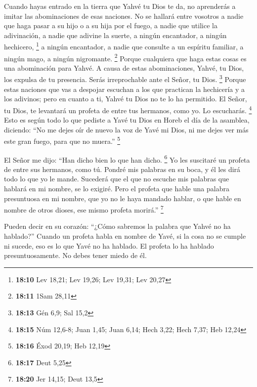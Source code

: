 \begin{paracol}{2}
 Cuando hayas entrado en la tierra que Yahvé tu Dios te
da, no aprenderás a imitar las abominaciones de esas naciones.
 No se hallará entre vosotros a nadie que haga pasar a su
hijo o a su hija por el fuego, a nadie que utilice la adivinación, a
nadie que adivine la suerte, a ningún encantador, a ningún hechicero,
\footnote{\textbf{18:10} Lev 18,21; Lev 19,26; Lev 19,31; Lev 20,27}
 a ningún encantador, a nadie que consulte a un espíritu
familiar, a ningún mago, a ningún nigromante. \footnote{\textbf{18:11}
  1Sam 28,11}  Porque cualquiera que haga estas cosas es
una abominación para Yahvé. A causa de estas abominaciones, Yahvé, tu
Dios, los expulsa de tu presencia.  Serás irreprochable
ante el Señor, tu Dios. \footnote{\textbf{18:13} Gén 6,9; Sal 15,2}
 Porque estas naciones que vas a despojar escuchan a los
que practican la hechicería y a los adivinos; pero en cuanto a ti, Yahvé
tu Dios no te lo ha permitido.  El Señor, tu Dios, te
levantará un profeta de entre tus hermanos, como yo. Lo escucharás.
\footnote{\textbf{18:15} Núm 12,6-8; Juan 1,45; Juan 6,14; Hech 3,22;
  Hech 7,37; Heb 12,24}  Esto es según todo lo que
pediste a Yavé tu Dios en Horeb el día de la asamblea, diciendo: ``No me
dejes oír de nuevo la voz de Yavé mi Dios, ni me dejes ver más este gran
fuego, para que no muera.'' \footnote{\textbf{18:16} Éxod 20,19; Heb
  12,19}

 El Señor me dijo: ``Han dicho bien lo que han dicho.
\footnote{\textbf{18:17} Deut 5,25}  Yo les suscitaré un
profeta de entre sus hermanos, como tú. Pondré mis palabras en su boca,
y él les dirá todo lo que yo le mande.  Sucederá que el
que no escuche mis palabras que hablará en mi nombre, se lo exigiré.
 Pero el profeta que hable una palabra presuntuosa en mi
nombre, que yo no le haya mandado hablar, o que hable en nombre de otros
dioses, ese mismo profeta morirá.'' \footnote{\textbf{18:20} Jer 14,15;
  Deut 13,5}

 Pueden decir en su corazón: ``¿Cómo sabremos la palabra
que Yahvé no ha hablado?''  Cuando un profeta habla en
nombre de Yavé, si la cosa no se cumple ni sucede, eso es lo que Yavé no
ha hablado. El profeta lo ha hablado presuntuosamente. No debes tener
miedo de él.

\switchcolumn
\begin{otherlanguage}{english}


\end{otherlanguage}
\end{paracol}
